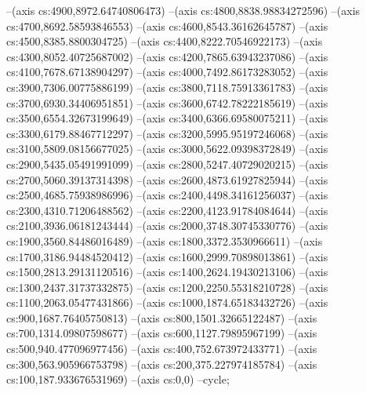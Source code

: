 --(axis cs:4900,8972.64740806473)
--(axis cs:4800,8838.98834272596)
--(axis cs:4700,8692.58593846553)
--(axis cs:4600,8543.36162645787)
--(axis cs:4500,8385.8800304725)
--(axis cs:4400,8222.70546922173)
--(axis cs:4300,8052.40725687002)
--(axis cs:4200,7865.63943237086)
--(axis cs:4100,7678.67138904297)
--(axis cs:4000,7492.86173283052)
--(axis cs:3900,7306.00775886199)
--(axis cs:3800,7118.75913361783)
--(axis cs:3700,6930.34406951851)
--(axis cs:3600,6742.78222185619)
--(axis cs:3500,6554.32673199649)
--(axis cs:3400,6366.69580075211)
--(axis cs:3300,6179.88467712297)
--(axis cs:3200,5995.95197246068)
--(axis cs:3100,5809.08156677025)
--(axis cs:3000,5622.09398372849)
--(axis cs:2900,5435.05491991099)
--(axis cs:2800,5247.40729020215)
--(axis cs:2700,5060.39137314398)
--(axis cs:2600,4873.61927825944)
--(axis cs:2500,4685.75938986996)
--(axis cs:2400,4498.34161256037)
--(axis cs:2300,4310.71206488562)
--(axis cs:2200,4123.91784084644)
--(axis cs:2100,3936.06181243444)
--(axis cs:2000,3748.30745330776)
--(axis cs:1900,3560.84486016489)
--(axis cs:1800,3372.3530966611)
--(axis cs:1700,3186.94484520412)
--(axis cs:1600,2999.70898013861)
--(axis cs:1500,2813.29131120516)
--(axis cs:1400,2624.19430213106)
--(axis cs:1300,2437.31737332875)
--(axis cs:1200,2250.55318210728)
--(axis cs:1100,2063.05477431866)
--(axis cs:1000,1874.65183432726)
--(axis cs:900,1687.76405750813)
--(axis cs:800,1501.32665122487)
--(axis cs:700,1314.09807598677)
--(axis cs:600,1127.79895967199)
--(axis cs:500,940.477096977456)
--(axis cs:400,752.673972433771)
--(axis cs:300,563.905966753798)
--(axis cs:200,375.227974185784)
--(axis cs:100,187.933676531969)
--(axis cs:0,0)
--cycle;


